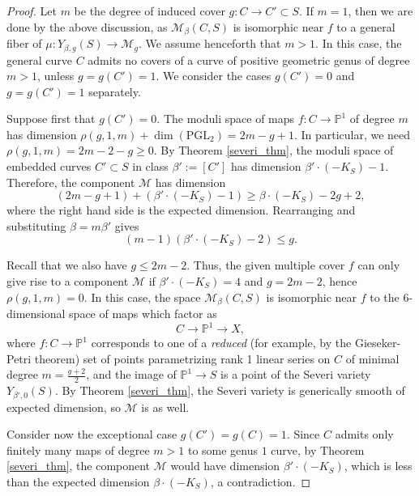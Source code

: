 \documentclass[10pt,a4paper]{amsart}
\def\P{\mathbb{P}}
\def\cM{{\mathcal{M}}}
\begin{document}
 \begin{proof}
Let $m$ be the degree of induced cover $g:C\to C'\subset S$. If $m=1$, then we are done by the above discussion, as $\cM_{\beta}(C,S)$ is isomorphic near $f$ to a general fiber of $\mu:Y_{\beta,g}(S)\to\cM_g$. We assume henceforth that $m>1$. In this case, the general curve $C$ admits no covers of a curve of positive geometric genus of degree $m>1$, unless $g=g(C')=1$. We consider the cases $g(C')=0$ and $g=g(C')=1$ separately.

Suppose first that $g(C')=0$. The moduli space of maps $f:C\to \P^1$ of degree $m$ has dimension $\rho(g,1,m)+\dim(\text{PGL}_2)=2m-g+1$. In particular, we need $\rho(g,1,m)=2m-2-g\ge0$.
By Theorem \ref{severi_thm}, the moduli space of embedded curves $C'\subset S$ in class $\beta':=[C']$ has dimension $\beta'\cdot (-K_S)-1$. Therefore, the component $\cM$ has dimension
        \begin{equation*}
            (2m-g+1)+(\beta'\cdot (-K_S)-1) \ge \beta\cdot (-K_S)-2g+2,
        \end{equation*}
        where the right hand side is the expected dimension. Rearranging and substituting $\beta=m\beta'$ gives
       \begin{equation*}
              (m-1)(\beta'\cdot (-K_S)-2) \le g.
         \end{equation*} 
         
Recall that we also have $g\le 2m-2$. Thus, the given multiple cover $f$ can only give rise to a component $\cM$ if $\beta'\cdot (-K_S)=4$ and $g=2m-2$, hence $\rho(g,1,m)=0$. In this case, the space $\cM_\beta(C,S)$ is isomorphic near $f$ to the 6-dimensional space of maps which factor as 
        \begin{equation*}
            C\to \P^1\to X,
        \end{equation*}
        where $f:C\to\P^1$ corresponds to one of a \emph{reduced} (for example, by the Gieseker-Petri theorem) set of points parametrizing rank 1 linear series on $C$ of minimal degree $m=\frac{g+2}{2}$, and the image of $\P^1\to S$ is a point of the Severi variety $Y_{\beta',0}(S)$. By Theorem \ref{severi_thm}, the Severi variety is generically smooth 
        of expected dimension, so $\cM$ is as well.
        
Consider now the exceptional case $g(C')=g(C)=1$. Since $C$ admits only finitely many maps of degree $m>1$ to some genus $1$ curve, by Theorem \ref{severi_thm}, the component $\cM$ would have dimension $\beta' \cdot (-K_S)$, which is less than the expected dimension $\beta\cdot (-K_S)$, a contradiction.

 \end{proof}
\end{document}

